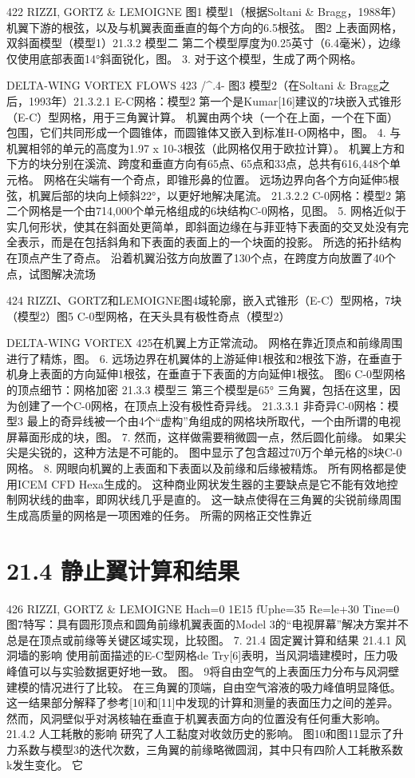 \documentclass[UTF8,11pt,a4paper,openany,fontset=fandol]{ctexbook}
\begin{document}
422 RIZZI, GORTZ \& LEMOIGNE 图1 模型1（根据Soltani \& Bragg，1988年）机翼下游的根弦，以及与机翼表面垂直的每个方向的6.5根弦。 图2 上表面网格，双斜面模型（模型1）21.3.2 模型二 第二个模型厚度为0.25英寸（6.4毫米），边缘仅使用底部表面14°斜面锐化，图。 3. 对于这个模型，生成了两个网格。

DELTA-WING VORTEX FLOWS 423 /\textasciicircum{}.4- 图3 模型2（在Soltani \& Bragg之后，1993年）21.3.2.1 E-C网格：模型2 第一个是Kumar[16]建议的7块嵌入式锥形（E-C）型网格，用于三角翼计算。 机翼由两个块（一个在上面，一个在下面）包围，它们共同形成一个圆锥体，而圆锥体又嵌入到标准H-O网格中，图。 4. 与机翼相邻的单元的高度为1.97 x 10-3根弦（此网格仅用于欧拉计算）。 机翼上方和下方的块分别在溪流、跨度和垂直方向有65点、65点和33点，总共有616,448个单元格。 网格在尖端有一个奇点，即锥形鼻的位置。 远场边界向各个方向延伸5根弦，机翼后部的块向上倾斜22°，以更好地解决尾流。 21.3.2.2 C-0网格：模型2 第二个网格是一个由714,000个单元格组成的6块结构C-0网格，见图。 5. 网格近似于实几何形状，使其在斜面处更简单，即斜面边缘在与菲亚特下表面的交叉处没有完全表示，而是在包括斜角和下表面的表面上的一个块面的投影。 所选的拓扑结构在顶点产生了奇点。 沿着机翼沿弦方向放置了130个点，在跨度方向放置了40个点，试图解决流场

424 RIZZI、GORTZ和LEMOIGNE图4域轮廓，嵌入式锥形（E-C）型网格，7块（模型2）图5 C-0型网格，在天头具有极性奇点（模型2）

DELTA-WING VORTEX 425在机翼上方正常流动。 网格在靠近顶点和前缘周围进行了精炼，图。 6. 远场边界在机翼体的上游延伸1根弦和2根弦下游，在垂直于机身上表面的方向延伸1根弦，在垂直于下表面的方向延伸1根弦。 图6 C-0型网格的顶点细节：网格加密 21.3.3 模型三 第三个模型是65° 三角翼，包括在这里，因为创建了一个C-0网格，在顶点上没有极性奇异线。 21.3.3.1 非奇异C-0网格：模型3 最上的奇异线被一个由4个“虚构”角组成的网格块所取代，一个由所谓的电视屏幕面形成的块，图。 7. 然而，这样做需要稍微圆一点，然后圆化前缘。 如果尖尖是尖锐的，这种方法是不可能的。 图中显示了包含超过70万个单元格的8块C-0网格。 8. 网眼向机翼的上表面和下表面以及前缘和后缘被精炼。 所有网格都是使用ICEM CFD Hexa生成的。 这种商业网状发生器的主要缺点是它不能有效地控制网状线的曲率，即网状线几乎是直的。 这一缺点使得在三角翼的尖锐前缘周围生成高质量的网格是一项困难的任务。 所需的网格正交性靠近

\section{21.4 静止翼计算和结果}
426 RIZZI, GORTZ \& LEMOIGNE Hach=0 1E15 fUphe=35 Re=le+30 Tine=0 图7特写：具有圆形顶点和圆角前缘机翼表面的Model 3的“电视屏幕”解决方案并不总是在顶点或前缘等关键区域实现，比较图。 7. 21.4 固定翼计算和结果 21.4.1 风洞墙的影响 使用前面描述的E-C型网格de Try[6]表明，当风洞墙建模时，压力吸峰值可以与实验数据更好地一致。 图。 9将自由空气的上表面压力分布与风洞壁建模的情况进行了比较。 在三角翼的顶端，自由空气溶液的吸力峰值明显降低。 这一结果部分解释了参考[10]和[11]中发现的计算和测量的表面压力之间的差异。 然而，风洞壁似乎对涡核轴在垂直于机翼表面方向的位置没有任何重大影响。 21.4.2 人工耗散的影响 研究了人工黏度对收敛历史的影响。 图10和图11显示了升力系数与模型3的迭代次数，三角翼的前缘略微圆润，其中只有四阶人工耗散系数k发生变化。 它
\end{document}
